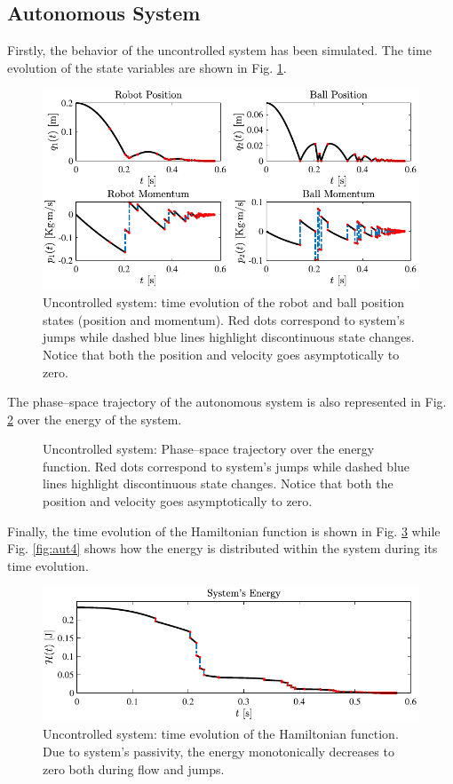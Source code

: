 \subsection{Autonomous System}
%
Firstly, the behavior of the uncontrolled system has been simulated. The time evolution of the state variables are shown in Fig. \ref{fig:aut1}.
%
\begin{figure}[!ht]
	\centering
	\includegraphics[width = \linewidth]{Figures/aut1.pdf}
	\caption[Uncontrolled system: time evolution of the robot and ball position states]{Uncontrolled system: time evolution of the robot and ball position states (position and momentum). Red dots correspond to system's jumps while dashed blue lines highlight discontinuous state changes. Notice that both the position and velocity goes asymptotically to zero.}
	\label{fig:aut1}
\end{figure}
%
The phase--space trajectory of the autonomous system is also represented in Fig. \ref{fig:aut2} over the energy of the system. 
%
\begin{figure}[!ht]
	\centering
    
	\caption[Uncontrolled system: Phase--space trajectory over the energy function]{Uncontrolled system: Phase--space trajectory over the energy function. Red dots correspond to system's jumps while dashed blue lines highlight discontinuous state changes. Notice that both the position and velocity goes asymptotically to zero.}
	\label{fig:aut2}
\end{figure}
%
Finally, the time evolution of the Hamiltonian function is shown in Fig. \ref{fig:aut3} while Fig. \ref{fig:aut4} shows how the energy is distributed within the system during its time evolution.
%
\begin{figure}[!ht]
	\centering
	\includegraphics[width=\linewidth]{Figures/aut3.pdf}
	\caption[Uncontrolled system: time evolution of the Hamiltonian function.]{Uncontrolled system: time evolution of the Hamiltonian function. Due to system's passivity, the energy monotonically decreases to zero both during flow and jumps.}
	\label{fig:aut3}
\end{figure}
